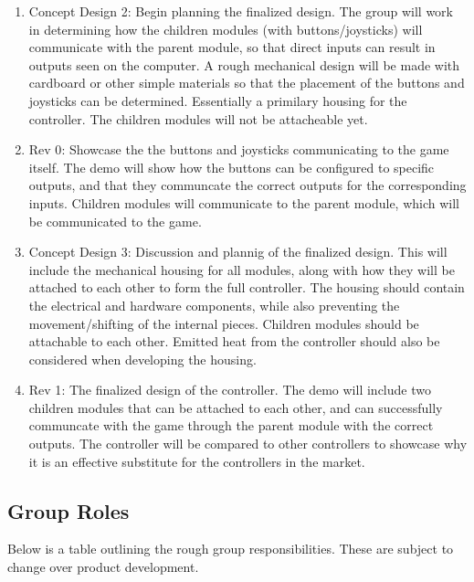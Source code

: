 \documentclass[a4]{article}
\begin{document}
\begin{enumerate}
    \item \textcolor{McMasterMaroon}{Concept Design 2}: Begin planning the finalized design. The group will work in determining how the children modules (with buttons/joysticks) will communicate with the parent module, so that direct inputs can result in outputs seen on the computer. A rough mechanical design will be made with cardboard or other simple materials so that the placement of the buttons and joysticks can be determined. Essentially a primilary housing for the controller. The children modules will not be attacheable yet.
    \item \textcolor{McMasterMaroon}{Rev 0}: Showcase the the buttons and joysticks communicating to the game itself. The demo will show how the buttons can be configured to specific outputs, and that they communcate the correct outputs for the corresponding inputs. Children modules will communicate to the parent module, which will be communicated to the game.
    \item \textcolor{McMasterMaroon}{Concept Design 3}: Discussion and plannig of the finalized design. This will include the mechanical housing for all modules, along with how they will be attached to each other to form the full controller. The housing should contain the electrical and hardware components, while also preventing the movement/shifting of the internal pieces. Children modules should be attachable to each other. Emitted heat from the controller should also be considered when developing the housing.
    \item \textcolor{McMasterMaroon}{Rev 1}: The finalized design of the controller. The demo will include two children modules that can be attached to each other, and can successfully communcate with the game through the parent module with the correct outputs. The controller will be compared to other controllers to showcase why it is an effective substitute for the controllers in the market. 
\end{enumerate}

\clearpage
\subsection{Group Roles}

Below is a table outlining the rough group responsibilities. These are subject to change over product development.
\end{document}
